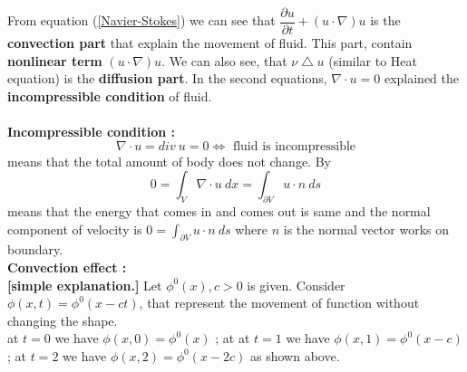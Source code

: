 \documentclass[a4paper,10pt]{article}
\begin{document}
From equation (\ref{Navier-Stokes}) we can see that $ \dfrac{\partial u}{\partial t} + (u \cdot \nabla) u $ is the \textbf{convection part} that explain the movement of fluid. This part, contain \textbf{nonlinear term} $ (u \cdot \nabla) u $. We can also see, that $ \nu \bigtriangleup u $ (similar to Heat equation) is the \textbf{diffusion part}. In the second equations, $ \nabla \cdot u = 0 $ explained the \textbf{incompressible condition} of fluid. \\ \\
\textbf{Incompressible condition :}
\[ \nabla \cdot u = div \ u = 0 \Leftrightarrow \text{ fluid is incompressible} \]
means that the total amount of body does not change. By
\[ 0 = \int_{V} \nabla \cdot u \ dx = \int_{\partial V} u \cdot n \ ds \]
means that the energy that comes in and comes out is same and the normal component of velocity is $ 0 = \int_{\partial V} u \cdot n \ ds $ where $ n $ is the normal vector works on boundary. \vspace{3cm} \\
\textbf{Convection effect :}\\
\textbf{[simple explanation.]} Let $ \phi^{0}(x), c>0 $ is given. Consider $ \phi(x,t) = \phi^{0}(x-ct) $, that represent the movement of function without changing the shape. \vspace{4cm} \\
at $ t=0 $ we have $ \phi(x,0) = \phi^{0}(x) $ ; at at $ t=1 $ we have $ \phi(x,1) = \phi^{0}(x-c) $ ; at $ t=2 $ we have $ \phi(x,2) = \phi^{0}(x-2c) $ as shown above. 
\end{document}
